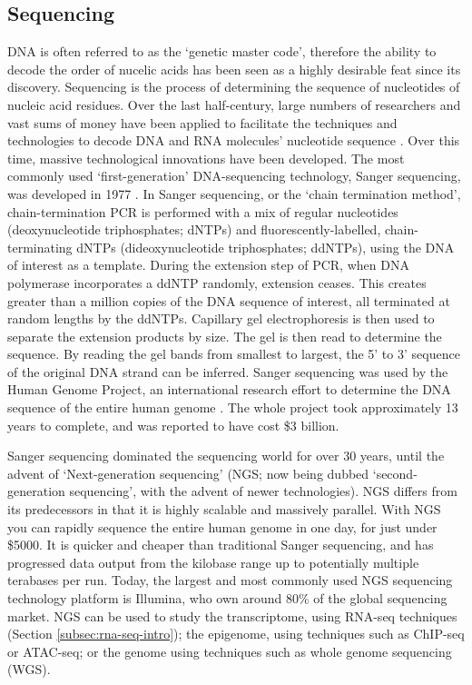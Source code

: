 \subsection{Sequencing}
DNA is often referred to as the `genetic master code', therefore the ability to decode the order of nucelic acids has been seen as a highly desirable feat since its discovery.
Sequencing is the process of determining the sequence of nucleotides of nucleic acid residues.
Over the last half-century, large numbers of researchers and vast sums of money have been applied to facilitate the techniques and technologies to decode DNA and RNA molecules' nucleotide sequence \cite{heather2016sequence}.
Over this time, massive technological innovations have been developed.
The most commonly used `first-generation' DNA-sequencing technology, Sanger sequencing, was developed in 1977 \cite{sanger1977dna}.
In Sanger sequencing, or the `chain termination method', chain-termination PCR is performed with a mix of regular nucleotides (deoxynucleotide triphosphates; dNTPs) and fluorescently-labelled, chain-terminating dNTPs (dideoxynucleotide triphosphates; ddNTPs), using the DNA of interest as a template.
During the extension step of PCR, when DNA polymerase incorporates a ddNTP randomly, extension ceases.
This creates greater than a million copies of the DNA sequence of interest, all terminated at random lengths by the ddNTPs.
Capillary gel electrophoresis is then used to separate the extension products by size.
The gel is then read to determine the sequence.
By reading the gel bands from smallest to largest, the 5' to 3' sequence of the original DNA strand can be inferred.
Sanger sequencing was used by the Human Genome Project, an international research effort to determine the DNA sequence of the entire human genome \cite{pennisi2001human}.
The whole project took approximately 13 years to complete, and was reported to have cost \$3 billion.

Sanger sequencing dominated the sequencing world for over 30 years, until the advent of `Next-generation sequencing' (NGS; now being dubbed `second-generation sequencing', with the advent of newer technologies).
NGS differs from its predecessors in that it is highly scalable and massively parallel.
With NGS you can rapidly sequence the entire human genome in one day, for just under \$5000.
It is quicker and cheaper than traditional Sanger sequencing, and has progressed data output from the kilobase range up to potentially multiple terabases per run.
Today, the largest and most commonly used NGS sequencing technology platform is Illumina, who own around 80\% of the global sequencing market.
NGS can be used to study the transcriptome, using RNA-seq techniques (Section \ref{subsec:rna-seq-intro}); the epigenome, using techniques such as ChIP-seq or ATAC-seq; or the genome using techniques such as whole genome sequencing (WGS).

